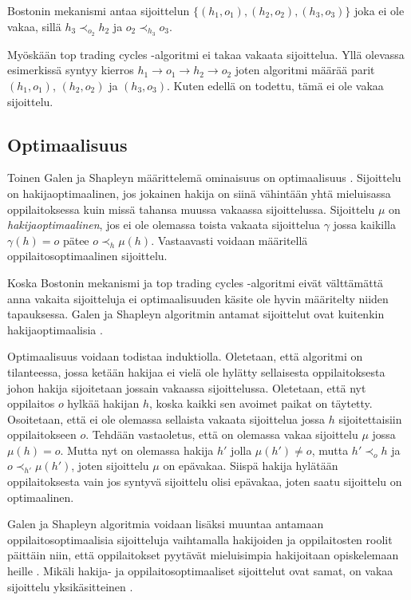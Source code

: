 \documentclass[gradu, twoside]{tktltiki}
\begin{document}
Bostonin mekanismi antaa sijoittelun $\{(h_1, o_1), (h_2, o_2), (h_3,
o_3)\}$ joka ei ole vakaa, sillä $h_3 \prec_{o_2} h_2$ ja $o_2
\prec_{h_3} o_3$.

Myöskään top trading cycles -algoritmi ei takaa vakaata sijoittelua.
Yllä olevassa esimerkissä syntyy kierros $h_1 \rightarrow o_1
\rightarrow h_2 \rightarrow o_2$ joten algoritmi määrää parit $(h_1,
o_1)$, $(h_2, o_2)$ ja $(h_3, o_3)$. Kuten edellä on todettu, tämä ei
ole vakaa sijoittelu.

\subsection{Optimaalisuus}

Toinen Galen ja Shapleyn määrittelemä ominaisuus on optimaalisuus
\cite{galeshapley62}. Sijoittelu on hakijaoptimaalinen, jos jokainen
hakija on siinä vähintään yhtä mieluisassa oppilaitoksessa kuin missä
tahansa muussa vakaassa sijoittelussa. Sijoittelu $\mu$ on
\emph{hakijaoptimaalinen}, jos ei ole olemassa toista vakaata
sijoittelua $\gamma$ jossa kaikilla $\gamma(h) = o$ pätee $o \prec_h
\mu(h)$. Vastaavasti voidaan määritellä oppilaitosoptimaalinen
sijoittelu.

Koska Bostonin mekanismi ja top trading cycles -algoritmi eivät
välttämättä anna vakaita sijoitteluja ei optimaalisuuden käsite ole
hyvin määritelty niiden tapauksessa. Galen ja Shapleyn algoritmin
antamat sijoittelut ovat kuitenkin hakijaoptimaalisia
\cite{galeshapley62}.

Optimaalisuus voidaan todistaa induktiolla. Oletetaan, että algoritmi
on tilanteessa, jossa ketään hakijaa ei vielä ole hylätty sellaisesta
oppilaitoksesta johon hakija sijoitetaan jossain vakaassa
sijoittelussa. Oletetaan, että nyt oppilaitos $o$ hylkää hakijan $h$,
koska kaikki sen avoimet paikat on täytetty. Osoitetaan, että ei ole
olemassa sellaista vakaata sijoittelua jossa $h$ sijoitettaisiin
oppilaitokseen $o$. Tehdään vastaoletus, että on olemassa vakaa
sijoittelu $\mu$ jossa $\mu(h) = o$. Mutta nyt on olemassa hakija $h'$
jolla $\mu(h') \neq o$, mutta $h' \prec_o h$ ja $o \prec_{h'}
\mu(h')$, joten sijoittelu $\mu$ on epävakaa. Siispä hakija hylätään
oppilaitoksesta vain jos syntyvä sijoittelu olisi epävakaa, joten
saatu sijoittelu on optimaalinen.

Galen ja Shapleyn algoritmia voidaan lisäksi muuntaa antamaan
oppilaitosoptimaalisia sijoitteluja vaihtamalla hakijoiden ja
oppilaitosten roolit päittäin niin, että oppilaitokset pyytävät
mieluisimpia hakijoitaan opiskelemaan heille \cite{galeshapley62}.
Mikäli hakija- ja oppilaitosoptimaaliset sijoittelut ovat samat, on
vakaa sijoittelu yksikäsitteinen \cite{galeshapley62}.
\end{document}
